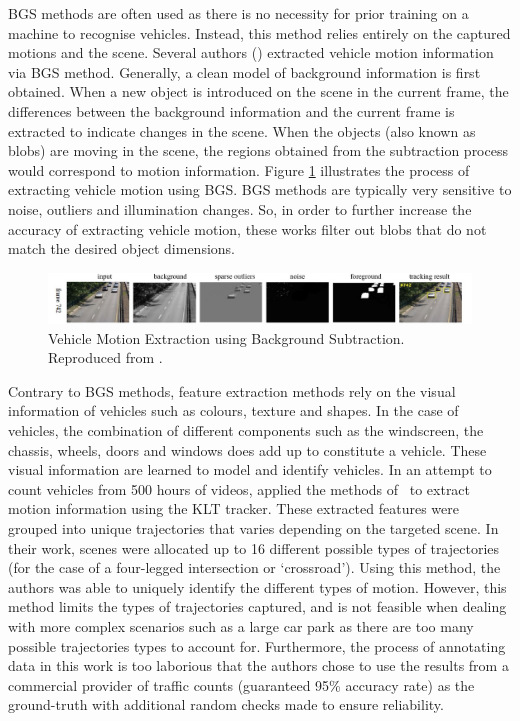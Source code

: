 BGS methods are often used as there is no necessity for prior training on a machine to recognise vehicles. Instead, this method relies entirely on the captured motions and the scene. Several
authors ()
extracted vehicle motion information via BGS method. Generally, a clean model of
background information is first obtained. When a new object is introduced on the
scene in the current frame, the differences between the background information and the current frame is extracted to indicate changes in the scene. When the objects (also known as blobs) are moving in the scene, the regions obtained from the subtraction
process would correspond to motion information. Figure \ref{fig:bgs2}
illustrates the process of extracting vehicle motion using BGS. BGS methods are typically very sensitive to noise, outliers and illumination changes. So, in order to further increase the accuracy of extracting vehicle motion, these works filter out blobs that do not match the desired object dimensions.

\begin{figure}[hbt!]
  \centering
 \includegraphics[width=1\textwidth]{image/lit/bgs.PNG}
  \caption[Vehicle Motion Extraction using Background Subtraction. From left:
  Input, Background Model, Sparse Outlier, Noise, Foreground, Tracking Result]
  {Vehicle Motion Extraction using Background Subtraction. %
  Reproduced from .}
\label{fig:bgs2}
\end{figure}

Contrary to BGS methods, feature extraction methods rely on the visual information of vehicles such as colours, texture and shapes. In the case of vehicles, the combination of different components such as the windscreen, the chassis, wheels, doors and windows does add up to constitute a vehicle. These visual information are learned to model and identify vehicles. In an attempt to count vehicles from 500 hours of
videos,  applied the methods of~ to extract motion information using the KLT tracker. These extracted features were grouped into unique trajectories that varies
depending on the targeted scene. In their work, scenes were allocated up to
16 different possible types of trajectories (for the case of a four-legged intersection or `crossroad'). Using this method, the authors was
able to uniquely identify the different types of motion. However, this method limits the types of trajectories captured, and is not feasible when dealing with more complex scenarios such as a large car park as there are too many possible trajectories types to account for. Furthermore, the process of annotating data in this work is too laborious 
that the authors chose to use the results from a commercial provider of traffic counts (guaranteed 95\% accuracy rate) as the ground-truth with additional random checks made to ensure reliability.

